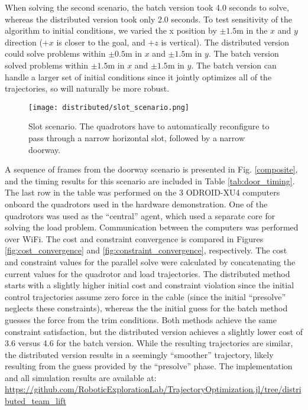 \documentclass[../root.tex]{subfiles}
\begin{document}
When solving the second scenario, the batch version took 4.0 seconds
to solve, whereas the distributed version took only 2.0 seconds. To test
sensitivity of the algorithm to initial conditions, we varied the x position
by $\pm 1.5$m in the $x$ and $y$ direction ($+x$ is closer to the goal, and
$+z$ is vertical). The distributed version could solve problems within $\pm
0.5$m in $x$ and $\pm 1.5$m in $y$. The batch version solved problems within
$\pm 1.5$m in $x$ and $\pm 1.5$m in $y$. The batch version can handle a
larger set of initial conditions since it jointly optimizes all of the
trajectories, so will naturally be more robust.

\begin{figure}
	\centering
	\texttt{[image: distributed/slot\_scenario.png]}
	\caption{Slot scenario. The quadrotors have to automatically
	reconfigure to pass through a narrow horizontal slot, followed by a
	narrow doorway.}
	\label{fig:slot_scenario}
\end{figure}

A sequence of frames from the doorway scenario is presented in Fig.
\ref{composite}, and the timing results for this scenario are included in
Table \ref{tab:door_timing}. The last row in the table was performed on the 3
ODROID-XU4 computers onboard the quadrotors used in the hardware
demonstration. One of the quadrotors was used as the ``central'' agent, which
used a separate core for solving the load problem. Communication between the
computers was performed over WiFi. The cost and constraint convergence
is compared in Figures \ref{fig:cost_convergence} and
\ref{fig:constraint_convergence}, respectively. The cost and constraint
values for the parallel solve were calculated by concatenating the current
values for the quadrotor and load trajectories. The distributed method starts
with a slightly higher initial cost and constraint violation since the
initial control trajectories assume zero force in the cable (since the
initial ``presolve'' neglects these constraints), whereas the the initial
guess for the batch method guesses the force from the trim conditions. Both
methods achieve the same constraint satisfaction, but the
distributed version achieves a slightly lower cost of
3.6 versus 4.6 for the
batch version. While the resulting trajectories
are similar, the distributed version results in a seemingly ``smoother''
trajectory, likely resulting from the guess provided by the ``presolve''
phase. The implementation and all simulation results are
available at:
\url{https://github.com/RoboticExplorationLab/TrajectoryOptimization.jl/tree/distributed_team_lift}
\end{document}
